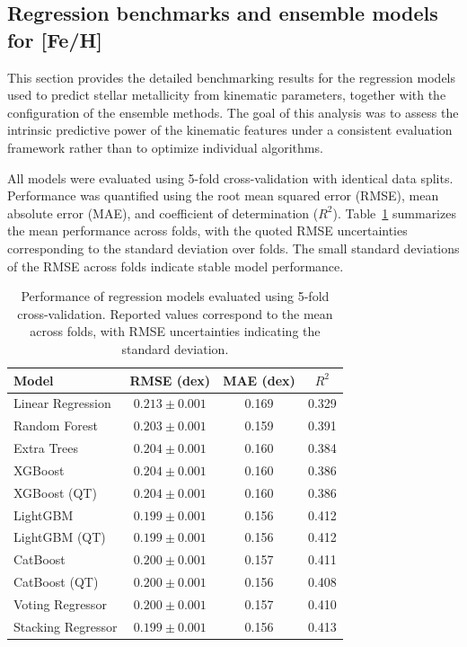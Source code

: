 \documentclass{aa}
\begin{document}
\begin{appendix}
\subsection{Regression benchmarks and ensemble models for [Fe/H]}

This section provides the detailed benchmarking results for the regression models used to predict stellar metallicity from kinematic parameters, together with the configuration of the ensemble methods. The goal of this analysis was to assess the intrinsic predictive power of the kinematic features under a consistent evaluation framework rather than to optimize individual algorithms.

All models were evaluated using 5-fold cross-validation with identical data splits. Performance was quantified using the root mean squared error (RMSE), mean absolute error (MAE), and coefficient of determination ($R^2$). Table~\ref{tab:cv_scores_full} summarizes the mean performance across folds, with the quoted RMSE uncertainties corresponding to the standard deviation over folds. The small standard deviations of the RMSE across folds indicate stable model performance.

\begin{table}
\caption{Performance of regression models evaluated using 5-fold cross-validation.
Reported values correspond to the mean across folds, with RMSE uncertainties
indicating the standard deviation.}
\centering
\begin{tabular}{lccc}
\hline
Model & RMSE (dex) & MAE (dex) & $R^2$ \\
\hline
Linear Regression & $0.213 \pm 0.001$ & 0.169 & 0.329 \\
Random Forest & $0.203 \pm 0.001$ & 0.159 & 0.391 \\
Extra Trees & $0.204 \pm 0.001$ & 0.160 & 0.384 \\
XGBoost & $0.204 \pm 0.001$ & 0.160 & 0.386 \\
XGBoost (QT) & $0.204 \pm 0.001$ & 0.160 & 0.386 \\
LightGBM & $\mathbf{0.199 \pm 0.001}$ & 0.156 & 0.412 \\
LightGBM (QT) & $0.199 \pm 0.001$ & 0.156 & 0.412 \\
CatBoost & $0.200 \pm 0.001$ & 0.157 & 0.411 \\
CatBoost (QT) & $0.200 \pm 0.001$ & 0.156 & 0.408 \\
Voting Regressor & $0.200 \pm 0.001$ & 0.157 & 0.410 \\
Stacking Regressor & $0.199 \pm 0.001$ & 0.156 & 0.413 \\
\hline
\end{tabular}
\label{tab:cv_scores_full}
\end{table}



\end{appendix}
\end{document}
